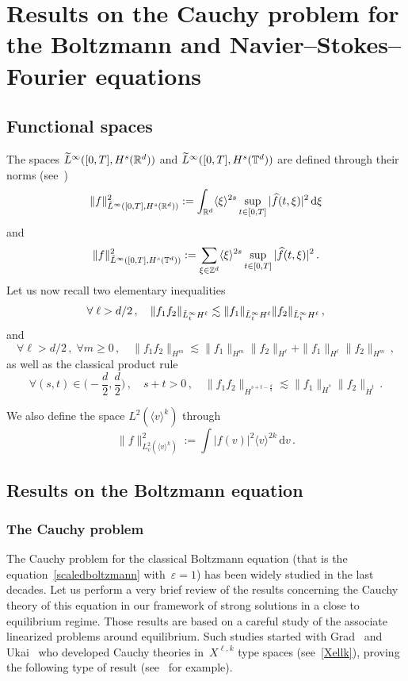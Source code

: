 \documentclass[11pt]{article}
\theoremstyle{definition}
\numberwithin{equation}{section}
\numberwithin{figure}{section}
\numberwithin{table}{section}
\newcommand*{\dd}{\mathrm{d}}
\newcommand*{\dv}{\dd v}
\newcommand*{\dxi}{\dd \xi}
\newcommand*\R {\mathbb{R}}
\newcommand*\T {\mathbb{T}}
\newcommand*\Z {\mathbb{Z}}
\newcommand*\eps{{\varepsilon}}
\let\oldforall\forall
\renewcommand*{\forall}{\mathrel{\oldforall}}
\let\oldtilde\tilde
\renewcommand*{\tilde}[1]{\mathchoice{\widetilde{#1}}{\widetilde{#1}}{\oldtilde{#1}}{\oldtilde{#1}}}
\begin{document}
\section{Results on the Cauchy problem for the Boltzmann and Navier--Stokes--Fourier equations}
\subsection{Functional spaces} The spaces $\tilde L^\infty([0,T],H^s(\R^d))$ and $\tilde L^\infty([0,T],H^s(\T^d))$ are defined through their norms (see~\cite{cheminlerner})
\[
\|f\|_{\tilde L^\infty([0,T],H^s(\R^d))}^2:= \int_{\R^d} \langle \xi \rangle^{2s} \sup_{t \in [0,T]} |\widehat f(t,\xi)|^2 \, \dxi
\]
and
\[
\|f\|_{\tilde L^\infty([0,T],H^s(\T^d))}^2:=\sum_{\xi \in \Z^d} \langle \xi \rangle^{2s} \sup_{t \in [0,T]} |\widehat f(t,\xi)|^2 \,.
\]
Let us now recall two elementary inequalities
\begin{equation}\label{lem:algebra}
\forall \ell>d/2 \,,\quad \|f_1 f_2\|_{ \tilde L^\infty_tH^\ell} \lesssim \|f_1 \|_{ \tilde L^\infty_tH^\ell} \|f_2\|_{ \tilde L^\infty_tH^\ell} \,,
\end{equation}
and
\begin{equation}\label{lem:prodHell}
\forall \ell>d/2 \,,\; \forall m\ge 0 \,, \quad
\|f_1 f_2\|_{H^{m} } \lesssim \|f_1\|_{H^{m} } \|f_2\|_{H^\ell} + \|f_1\|_{H^\ell } \|f_2\|_{H^{m} } \,,
\end{equation}
as well as the classical product rule
\begin{equation}\label{prodrules}
\forall (s,t) \in \bigg(-\frac d2,\frac d2\bigg) \,, \quad s+t>0 \,, \quad \|f_1 f_2\|_{\dot H^{s+t-\frac d2} } \lesssim \|f_1\|_{\dot H^{s} } \|f_2\|_{\dot H^t} \,.
\end{equation}



We also define the space $L^2(\langle v \rangle^k)$ through
\[
\|f\|_{L^2_v(\langle v \rangle^k)}^2:=\int |f(v)|^2 \langle v \rangle^{2k}\,\dv\,.
\]

\subsection{Results on the Boltzmann equation}\label{appendixbotlz}
\subsubsection{The Cauchy problem}
The Cauchy problem for the classical Boltzmann equation (that is the equation~\eqref{scaledboltzmann} with~$\eps=1$) has been widely studied in the last decades. Let us perform a very brief review of the results concerning the Cauchy theory of this equation in our framework of strong solutions in a close to equilibrium regime. Those results are based on a careful study of the associate linearized problems around equilibrium. Such studies started with Grad~\cite{Grad} and Ukai~\cite{Ukai} who developed Cauchy theories in~$X^{\ell,k}$ type spaces (see~\eqref{Xellk}), proving the following type of result (see~\cite{Bardos-Ukai,Glassey,Ukai} for example).
\end{document}
